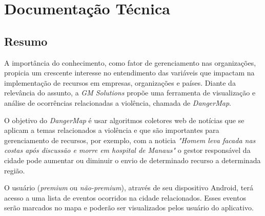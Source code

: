 \documentclass[
	12pt,				%
	openright,			%
	twoside,			%
	a4paper,			%
	english,			%
	french,				%
	spanish,			%
	brazil,				%
	]{abntex2}
\begin{document}

\frenchspacing 


\imprimircapa

\imprimirfolhaderosto*

\setlength{\absparsep}{18pt} %


\tableofcontents*
\cleardoublepage

\part{Documentação Técnica}


\chapter{Resumo}

A importância do conhecimento, como fator de gerenciamento nas organizações, propicia um crescente interesse no entendimento das variáveis que impactam na implementação de recursos em empresas, organizações e países. Diante da relevância do assunto, a \textit{GM Solutions} propõe uma ferramenta de visualização e análise de ocorrências relacionadas a violência, chamada de \textit{DangerMap}. 

O objetivo do \textit{DangerMap} é  usar algoritmos coletores web de notícias que se aplicam a temas relacionados a violência e que são importantes para gerenciamento de recursos, por exemplo, com a noticia \textit{"Homem leva facada nas costas após discussão e morre em hospital de Manaus"} o gestor responsável da cidade pode aumentar ou diminuir o envio de determinado recurso a determinada região.

O usuário (\textit{premium} ou \textit{não-premium}), através de seu dispositivo Android, terá acesso a uma lista de eventos ocorridos na cidade relacionados. Esses eventos serão marcados no mapa e poderão ser visualizados pelos usuário do aplicativo.
\end{document}
